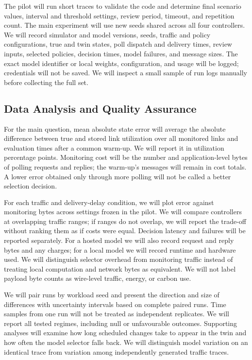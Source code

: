 \documentclass[11pt,a4paper]{article}
\begin{document}
The pilot will run short traces to validate the code and determine final scenario values, interval and threshold settings, review period, timeout, and repetition count. The main experiment will use new seeds shared across all four controllers. We will record simulator and model versions, seeds, traffic and policy configurations, true and twin states, poll dispatch and delivery times, review inputs, selected policies, decision times, model failures, and message sizes. The exact model identifier or local weights, configuration, and usage will be logged; credentials will not be saved. We will inspect a small sample of run logs manually before collecting the full set.

\subsection{Data Analysis and Quality Assurance}
For the main question, mean absolute state error will average the absolute difference between true and stored link utilization over all monitored links and evaluation times after a common warm-up. We will report it in utilization percentage points. Monitoring cost will be the number and application-level bytes of polling requests and replies; the warm-up's messages will remain in cost totals. A lower error obtained only through more polling will not be called a better selection decision.

For each traffic and delivery-delay condition, we will plot error against monitoring bytes across settings frozen in the pilot. We will compare controllers at overlapping traffic ranges; if ranges do not overlap, we will report the trade-off without ranking them as if costs were equal. Decision latency and failures will be reported separately. For a hosted model we will also record request and reply bytes and any charges; for a local model we will record runtime and hardware used. We will distinguish selector overhead from monitoring traffic instead of treating local computation and network bytes as equivalent. We will not label payload byte counts as wire-level traffic, energy, or carbon use.

We will pair runs by workload seed and present the direction and size of differences with uncertainty intervals based on complete paired runs. Time samples from one run will not be treated as independent replicates. We will report all tested regimes, including null or unfavourable outcomes. Supporting analyses will examine how long scheduled changes take to appear in the twin and how often the model selector falls back. We will distinguish model variation on an identical trace from variation among independently generated traffic traces.
\end{document}
